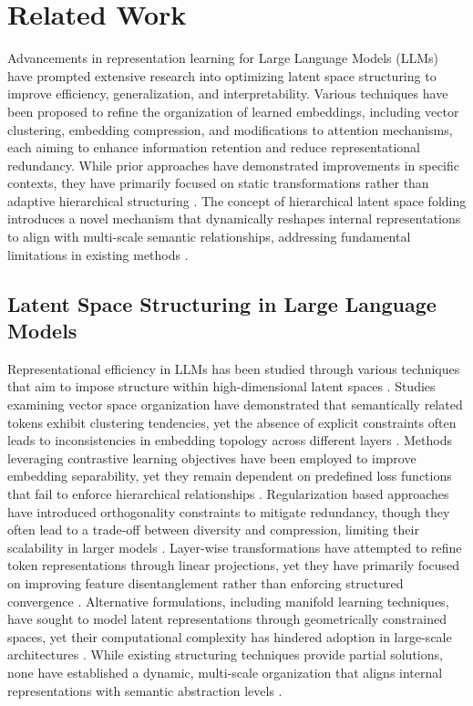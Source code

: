 \section{Related Work}
Advancements in representation learning for Large Language Models (LLMs) have prompted extensive research into optimizing latent space structuring to improve efficiency, generalization, and interpretability. Various techniques have been proposed to refine the organization of learned embeddings, including vector clustering, embedding compression, and modifications to attention mechanisms, each aiming to enhance information retention and reduce representational redundancy. While prior approaches have demonstrated improvements in specific contexts, they have primarily focused on static transformations rather than adaptive hierarchical structuring \cite{troy2024dynamic}. The concept of hierarchical latent space folding introduces a novel mechanism that dynamically reshapes internal representations to align with multi-scale semantic relationships, addressing fundamental limitations in existing methods \cite{mccartney2024introducing}. 

\subsection{Latent Space Structuring in Large Language Models}

Representational efficiency in LLMs has been studied through various techniques that aim to impose structure within high-dimensional latent spaces \cite{lemal2024dynamic}. Studies examining vector space organization have demonstrated that semantically related tokens exhibit clustering tendencies, yet the absence of explicit constraints often leads to inconsistencies in embedding topology across different layers \cite{ hu2024dynamic}. Methods leveraging contrastive learning objectives have been employed to improve embedding separability, yet they remain dependent on predefined loss functions that fail to enforce hierarchical relationships \cite{kiritani2024mitigating}. Regularization based approaches have introduced orthogonality constraints to mitigate redundancy, though they often lead to a trade-off between diversity and compression, limiting their scalability in larger models \cite{wilson2024contextual}. Layer-wise transformations have attempted to refine token representations through linear projections, yet they have primarily focused on improving feature disentanglement rather than enforcing structured convergence \cite{yuan2024comparative}. Alternative formulations, including manifold learning techniques, have sought to model latent representations through geometrically constrained spaces, yet their computational complexity has hindered adoption in large-scale architectures \cite{giacomozzi2024innovative, monafal2024optimizing}. While existing structuring techniques provide partial solutions, none have established a dynamic, multi-scale organization that aligns internal representations with semantic abstraction levels \cite{vaillancourt2024instruction}.

